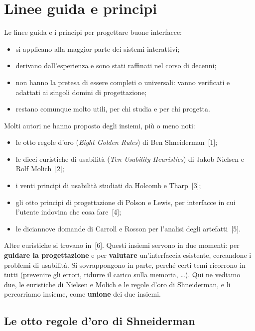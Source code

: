 \section{Linee guida e principi}

Le linee guida e i principi per progettare buone interfacce:

\begin{itemize}
  \item si applicano alla maggior parte dei sistemi interattivi;
  \item derivano dall'esperienza e sono stati raffinati nel corso di decenni;
  \item non hanno la pretesa di essere completi o universali: vanno verificati e adattati ai singoli domini di
        progettazione;
  \item restano comunque molto utili, per chi studia e per chi progetta.
\end{itemize}

Molti autori ne hanno proposto degli insiemi, più o meno noti:

\begin{itemize}
  \item le otto regole d'oro (\textit{Eight Golden Rules}) di Ben Shneiderman~[1];
  \item le dieci euristiche di usabilità (\textit{Ten Usability Heuristics}) di Jakob Nielsen e Rolf
        Molich~[2];
  \item i venti principi di usabilità studiati da Holcomb e Tharp~[3];
  \item gli otto principi di progettazione di Polson e Lewis, per interfacce in cui l'utente indovina che cosa
        fare~[4];
  \item le diciannove domande di Carroll e Rosson per l'analisi degli artefatti~[5].
\end{itemize}

Altre euristiche si trovano in~[6]. Questi insiemi servono in due momenti: per \textbf{guidare la
progettazione} e per \textbf{valutare} un'interfaccia esistente, cercandone i problemi di usabilità. Si sovrappongono in
parte, perché certi temi ricorrono in tutti (prevenire gli errori, ridurre il carico sulla memoria, \ldots). Qui ne
vediamo due, le euristiche di Nielsen e Molich e le regole d'oro di Shneiderman, e li percorriamo insieme, come
\textbf{unione} dei due insiemi.

\subsection{Le otto regole d'oro di Shneiderman}


